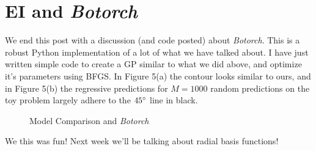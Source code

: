 \documentclass[12pt]{article}
\begin{document}
\section{EI and \emph{Botorch}}

We end this post with a discussion (and code posted) about \emph{Botorch}. This is a robust Python implementation of a lot of what we have talked about. I have just written simple code to create a GP similar to what we did above, and optimize it's parameters using BFGS. In Figure 5(a) the contour looks similar to ours, and in Figure 5(b) the regressive predictions for $M=1000$ random predictions on the toy problem largely adhere to the $45\degree$ line in black.

\begin{figure}
\centering
{}
\caption{Model Comparison and \emph{Botorch}}
\end{figure}

\vspace{5mm}

We this was fun! Next week we'll be talking about radial basis functions!
\end{document}
